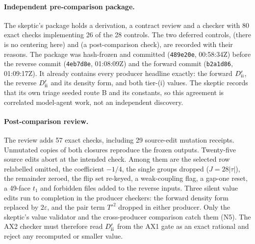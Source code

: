 \paragraph{Independent pre-comparison package.}
The skeptic's package holds a derivation, a contract review and a checker
with 80 exact checks implementing 26 of the 28 controls. The two deferred
controls,  (there is no centering here)
and  (a post-comparison check), are recorded
with their reasons. The package was hash-frozen and committed
(\texttt{489e20e}, 00:58:34Z) before the reverse commit (\texttt{4eb7d8e},
01:08:09Z) and the forward commit (\texttt{b2a1d86}, 01:09:17Z). It already
contains every producer headline exactly: the forward $D'_{\rm ii}$, the
reverse $D'_{\rm ii}$ and its density form, and both tier-(i) values. The
skeptic records that its own triage seeded route B and its constants, so this
agreement is correlated model-agent work, not an independent discovery.

\paragraph{Post-comparison review.}
The review adds 57 exact checks, including 29 source-edit mutation receipts.
Unmutated copies of both closures reproduce the frozen outputs. Twenty-five
source edits abort at the intended check. Among them are the selected row
relabelled omitted, the coefficient $-1/4$, the single groups dropped
($J=28|\tau|$), the remainder zeroed, the flip set re-keyed, a weak-coupling
flag, a gap-one reset, a 49-face $t_1$ and forbidden files added to the
reverse inputs. Three silent value edits run to completion in the producer
checkers: the forward density form replaced by $2\varepsilon$, and the pair
term $T'^2$ dropped in either producer. Only the skeptic's value validator and
the cross-producer comparison catch them (N5). The AX2 checker must therefore
read $D'_{\rm ii}$ from the AX1 gate as an exact rational and reject any
recomputed or smaller value.

